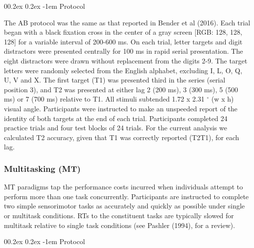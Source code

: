 \documentclass[
  man]{apa6}
\makeatletter
\let\oldparagraph\paragraph
\renewcommand{\paragraph}[1]{\oldparagraph{#1}\mbox{}}
\renewcommand{\paragraph}{\@startsection{paragraph}{4}{\parindent}%
  {0\baselineskip \@plus 0.2ex \@minus 0.2ex}%
  {-1em}%
  {\normalfont\normalsize\bfseries\itshape\typesectitle}}
\makeatother
\begin{document}
\hypertarget{protocol}{%
\paragraph{Protocol}\label{protocol}}

The AB protocol was the same as that reported in Bender et al (2016). Each trial began with a black fixation cross in the center of a gray screen {[}RGB: 128, 128, 128{]} for a variable interval of 200-600 ms. On each trial, letter targets and digit distractors were presented centrally for 100 ms in rapid serial presentation. The eight distractors were drawn without replacement from the digits 2-9. The target letters were randomly selected from the English alphabet, excluding I, L, O, Q, U, V and X. The first target (T1) was presented third in the series (serial position 3), and T2 was presented at either lag 2 (200 ms), 3 (300 ms), 5 (500 ms) or 7 (700 ms) relative to T1. All stimuli subtended 1.72 x 2.31 \(^\circ\) (w x h) visual angle. Participants were instructed to make an unspeeded report of the identity of both targets at the end of each trial. Participants completed 24 practice trials and four test blocks of 24 trials. For the current analysis we calculated T2 accuracy, given that T1 was correctly reported (T2\textbar T1), for each lag.

\hypertarget{multitasking-mt}{%
\subsubsection{Multitasking (MT)}\label{multitasking-mt}}

\label{sec:MTMeth}

MT paradigms tap the performance costs incurred when individuals attempt to perform more than one task concurrently. Participants are instructed to complete two simple sensorimotor tasks as accurately and quickly as possible under single or multitask conditions. RTs to the constituent tasks are typically slowed for multitask relative to single task conditions (see Pashler (1994), for a review).

\hypertarget{protocol-1}{%
\paragraph{Protocol}\label{protocol-1}}
\end{document}
